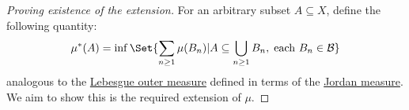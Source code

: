\documentclass{article}
\newcommand{\1}[1]{\mathbbm{1}_{#1}}
\begin{document}
\begin{proof}[Proving existence of the extension]
    For an arbitrary subset $A \subseteq X$, define the following quantity:
    \begin{equation*}
        \mu^*(A) = \inf\Set{\sum_{n \geq 1} \mu(B_n) | A \subseteq \bigcup_{n \geq 1} B_n, \; \text{each} \ B_n \in \mathcal{B}}
    \end{equation*}
    analogous to the \hyperlink{def:lebOutMeas}{Lebesgue outer measure} defined in terms of the \hyperlink{def:jMeasure}{Jordan measure}.
    We aim to show this is the required extension of $\mu$. \qedhere






\end{proof}
\end{document}
